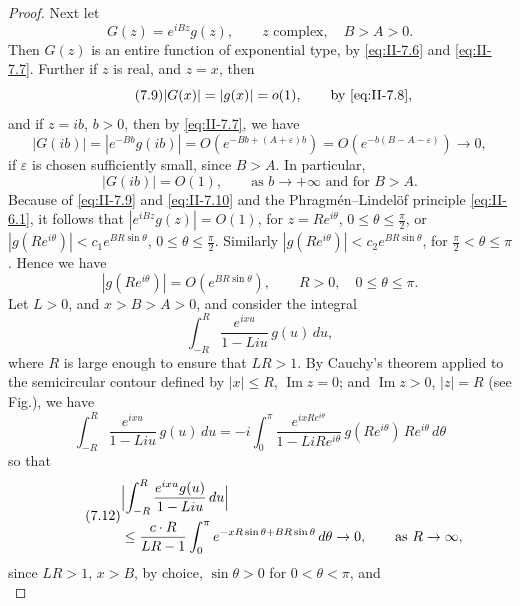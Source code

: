 \begin{proof}
Next let
\begin{equation}\tag{7.8}\label{eq:II-7.8}
G(z)=e^{iBz}g(z),\qquad z\text{ complex},\quad B>A>0.
\end{equation}
Then $G(z)$ is an entire function of exponential type, by \eqref{eq:II-7.6} and \eqref{eq:II-7.7}. Further if $z$ is real, and $z=x$, then
\begin{equation}\tag{7.9}\label{eq:II-7.9}
|G(x)|=|g(x)|=o(1),\qquad\text{by \eqref{eq:II-7.8}},
\end{equation}
and if $z=ib$, $b>0$, then by \eqref{eq:II-7.7}, we have
\[
|G(ib)|=|e^{-Bb}g(ib)|=O(e^{-Bb+(A+\varepsilon)b})=O(e^{-b(B-A-\varepsilon)})\to 0,
\]
if $\varepsilon$ is chosen sufficiently small, since $B>A$. In particular,
\begin{equation}\tag{7.10}\label{eq:II-7.10}
|G(ib)|=O(1),\qquad\text{as }b\to+\infty\text{ and for }B>A.
\end{equation}
Because of \eqref{eq:II-7.9} and \eqref{eq:II-7.10} and the Phragm\'en--Lindel\"of principle \eqref{eq:II-6.1}, it follows that $|e^{iBz}g(z)|=O(1)$, for $z=Re^{i\theta}$, $0\le\theta\le\frac{\pi}{2}$, or $|g(Re^{i\theta})|<c_{1}e^{BR\sin\theta}$, $0\le\theta\le\frac{\pi}{2}$. Similarly $|g(Re^{i\theta})|<c_{2}e^{BR\sin\theta}$, for $\frac{\pi}{2}<\theta\le\pi$. Hence we have
\begin{equation}\tag{7.11}\label{eq:II-7.11}
|g(Re^{i\theta})|=O(e^{BR\sin\theta}),\qquad R>0,\quad 0\le\theta\le\pi.
\end{equation}
Let $L>0$, and $x>B>A>0$, and consider the integral
\[
\int_{-R}^{R}\frac{e^{ixu}}{1-Liu}\,g(u)\,du,
\]
where $R$ is large enough to ensure that $LR>1$. By Cauchy's theorem applied to the semicircular contour defined by $|x|\le R$, $\operatorname{Im}z=0$; and $\operatorname{Im}z>0$, $|z|=R$ (see Fig.), we have
\[
\int_{-R}^{R}\frac{e^{ixu}}{1-Liu}\,g(u)\,du
=-i\int_{0}^{\pi}\frac{e^{ixRe^{i\theta}}}{1-LiRe^{i\theta}}\,g(Re^{i\theta})\,Re^{i\theta}\,d\theta
\]
so that
\begin{equation}\tag{7.12}\label{eq:II-7.12}
\begin{aligned}
&\Bigl|  \int_{-R}^{R}\frac{e^{ixu}g(u)}{1-Liu}\,du\Bigr|\\
&\le \frac{c\cdot R}{LR-1}  \int_{0}^{\pi}e^{-xR\sin\theta+B R\sin\theta}\,d\theta \to 0,  \qquad\text{as }R \to \infty,
\end{aligned}
\end{equation}
since $LR>1$, $x>B$, by choice, $\sin\theta>0$ for $0<\theta<\pi$, and
\begin{equation}\tag{7.13}\label{eq:II-7.13}

\end{equation}
\end{proof}
